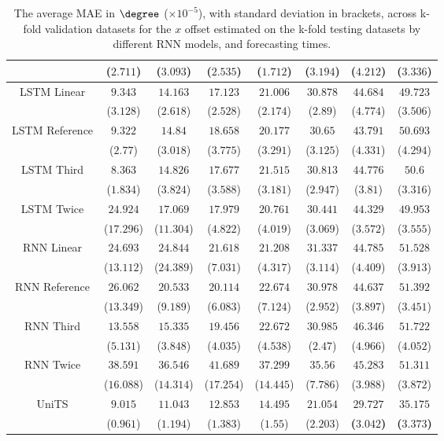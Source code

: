 \begin{table}[!ht]
{\begin{tabular}{|c|c|c|c|c|c|c|c|}
			 & ($2.711$) & ($3.093$) & ($2.535$) & ($1.712$) & ($3.194$) & ($4.212$) & ($3.336$) \\ \hline
			\multirow{2}{*}{LSTM Linear} & $9.343$ & $14.163$ & $17.123$ & $21.006$ & $30.878$ & $44.684$ & $49.723$ \\
			 & ($3.128$) & ($2.618$) & ($2.528$) & ($2.174$) & ($2.89$) & ($4.774$) & ($3.506$) \\ \hline
			\multirow{2}{*}{LSTM Reference} & $9.322$ & $14.84$ & $18.658$ & $20.177$ & $30.65$ & $43.791$ & $50.693$ \\
			 & ($2.77$) & ($3.018$) & ($3.775$) & ($3.291$) & ($3.125$) & ($4.331$) & ($4.294$) \\ \hline
			\multirow{2}{*}{LSTM Third} & $8.363$ & $14.826$ & $17.677$ & $21.515$ & $30.813$ & $44.776$ & $50.6$ \\
			 & ($1.834$) & ($3.824$) & ($3.588$) & ($3.181$) & ($2.947$) & ($3.81$) & ($3.316$) \\ \hline
			\multirow{2}{*}{LSTM Twice} & $24.924$ & $17.069$ & $17.979$ & $20.761$ & $30.441$ & $44.329$ & $49.953$ \\
			 & ($17.296$) & ($11.304$) & ($4.822$) & ($4.019$) & ($3.069$) & ($3.572$) & ($3.555$) \\ \hline
			\multirow{2}{*}{RNN Linear} & $24.693$ & $24.844$ & $21.618$ & $21.208$ & $31.337$ & $44.785$ & $51.528$ \\
			 & ($13.112$) & ($24.389$) & ($7.031$) & ($4.317$) & ($3.114$) & ($4.409$) & ($3.913$) \\ \hline
			\multirow{2}{*}{RNN Reference} & $26.062$ & $20.533$ & $20.114$ & $22.674$ & $30.978$ & $44.637$ & $51.392$ \\
			 & ($13.349$) & ($9.189$) & ($6.083$) & ($7.124$) & ($2.952$) & ($3.897$) & ($3.451$) \\ \hline
			\multirow{2}{*}{RNN Third} & $13.558$ & $15.335$ & $19.456$ & $22.672$ & $30.985$ & $46.346$ & $51.722$ \\
			 & ($5.131$) & ($3.848$) & ($4.035$) & ($4.538$) & ($2.47$) & ($4.966$) & ($4.052$) \\ \hline
			\multirow{2}{*}{RNN Twice} & $38.591$ & $36.546$ & $41.689$ & $37.299$ & $35.56$ & $45.283$ & $51.311$ \\
			 & ($16.088$) & ($14.314$) & ($17.254$) & ($14.445$) & ($7.786$) & ($3.988$) & ($3.872$) \\ \hline
			\multirow{2}{*}{UniTS} & $9.015$ & $11.043$ & $12.853$ & $14.495$ & $21.054$ & $\mathbf{29.727}$ & $\mathbf{35.175}$ \\
			 & ($0.961$) & ($1.194$) & ($1.383$) & ($1.55$) & ($2.203$) & \textbf{(}$\mathbf{3.042}$\textbf{)} & \textbf{(}$\mathbf{3.373}$\textbf{)} \\ \hline
		\end{tabular}
	}
	\caption{The average MAE in $\degree$ ($\times 10^{-5}$), with standard deviation in brackets, across k-fold validation datasets for the $x$ offset estimated on the k-fold testing datasets by different RNN models, and forecasting times.}
	\label{tab:all_longitude_no_abs_MAE}
\end{table}